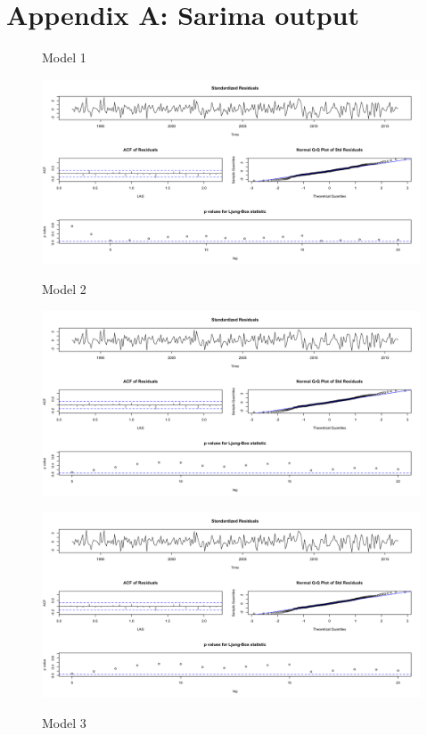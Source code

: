 \documentclass[twoside,twocolumn]{article}
\begin{document}
\blindtext %


\begin{flushleft}
\end{flushleft}

\appendix
\section*{Appendix A: Sarima output} \label{App:AppendixA}

       \begin{figure}[H]
    	\centering
     	\caption{Model 1}
     	\includegraphics[width=\linewidth]{images/sarima1}
     	\label{fig:sarima1}
     	     	\caption{Model 2}
     	\includegraphics[width=\linewidth]{images/sarima2}
     	\label{fig:sarima2}
     	    	\caption{Model 3}
     	\includegraphics[width=\linewidth]{images/sarima3}
     	\label{fig:sarima3}
      \end{figure}
      
\end{document}
